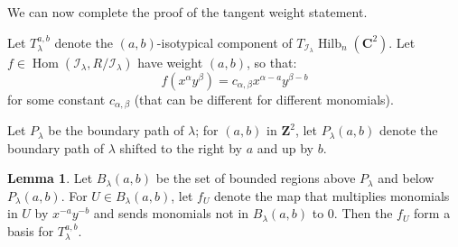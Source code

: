 \documentclass{amsart}[12pt]
\theoremstyle{definition}
\newtheorem{lemma}[dummy]{Lemma}
\newcommand{\Z}{\mathbf{Z}}
\newcommand{\C}{\mathbf{C}}
\DeclareMathOperator{\Hilb}{Hilb}
\DeclareMathOperator{\Hom}{Hom}
\begin{document}
We can now complete the proof of the tangent weight statement.


Let $T_\lambda^{a,b}$ denote the $(a,b)$-isotypical component of $T_{\mathcal{I}_\lambda}\Hilb_n(\C^2)$.  Let $f\in\Hom(\mathcal{I}_\lambda, R/\mathcal{I}_\lambda)$ have weight $(a,b)$, so that:
$$f(x^{\alpha}y^\beta)=c_{\alpha,\beta} x^{\alpha-a}y^{\beta-b}$$
for some constant $c_{\alpha, \beta}$ (that can be different for different monomials).  


Let $P_\lambda$ be the boundary path of $\lambda$; for $(a,b)$ in $\Z^2$, let $P_\lambda(a,b)$ denote the boundary path of $\lambda$ shifted to the right by $a$ and up by $b$.

\begin{lemma} Let $B_\lambda(a,b)$ be the set of bounded regions above $P_\lambda$ and below $P_\lambda(a,b)$.  For $U\in B_\lambda(a,b)$, let $f_U$ denote the map that multiplies monomials in $U$ by $x^{-a}y^{-b}$ and sends monomials not in $B_\lambda(a,b)$ to $0$.  Then the $f_U$ form a basis for $T_\lambda^{a,b}$.
\end{lemma}
\end{document}
